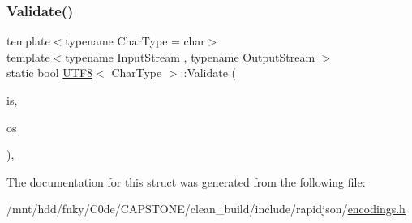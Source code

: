 \mbox{\label{structUTF8_a9e2e7e37d819baeb5e643654c6e61e33}} 
\subsubsection{\texorpdfstring{Validate()}{Validate()}}
{\footnotesize\ttfamily template$<$typename Char\+Type  = char$>$ \\
template$<$typename Input\+Stream , typename Output\+Stream $>$ \\
static bool \hyperlink{structUTF8}{U\+T\+F8}$<$ Char\+Type $>$\+::Validate (\begin{DoxyParamCaption}\item[{Input\+Stream \&}]{is,  }\item[{Output\+Stream \&}]{os }\end{DoxyParamCaption})\hspace{0.3cm}{\ttfamily [inline]}, {\ttfamily [static]}}



The documentation for this struct was generated from the following file\+:\begin{DoxyCompactItemize}
\item 
/mnt/hdd/fnky/\+C0de/\+C\+A\+P\+S\+T\+O\+N\+E/clean\+\_\+build/include/rapidjson/\hyperlink{encodings_8h}{encodings.\+h}\end{DoxyCompactItemize}
